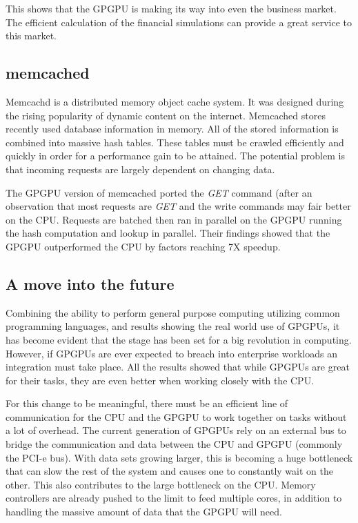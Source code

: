 This shows that the GPGPU is making its way into even the business market. The efficient calculation of the financial simulations can provide a great service to this market. \cite{finance}

\subsection*{memcached}


Memcachd is a distributed memory object cache system. It was designed during the rising popularity of dynamic content on the internet. Memcached stores recently used database information in memory. All of the stored information is combined into massive hash tables. These tables must be crawled efficiently and quickly in order for a performance gain to be attained. The potential problem is that incoming requests are largely dependent on changing data. 

The GPGPU version of memcached ported the \textit{GET} command (after an observation that most requests are \textit{GET} and the write commands may fair better on the CPU. Requests are batched then ran in parallel on the GPGPU running the hash computation and lookup in parallel. Their findings showed that the GPGPU outperformed the CPU by factors reaching 7X speedup. \cite{memcached}


\subsection*{A move into the future}

Combining the ability to perform general purpose computing utilizing common programming languages, and results showing the real world use of GPGPUs, it has become evident that the stage has been set for a big revolution in computing. However, if GPGPUs are ever expected to breach into enterprise workloads an integration must take place. All the results showed that while GPGPUs are great for their tasks, they are even better when working closely with the CPU. 

For this change to be meaningful, there must be an efficient line of communication for the CPU and the GPGPU to work together on tasks without a lot of overhead. The current generation of GPGPUs rely on an external bus to bridge the communication and data between the CPU and GPGPU (commonly the PCI-e bus). With data sets growing larger, this is becoming a huge bottleneck that can slow the rest of the system and causes one to constantly wait on the other. This also contributes to the large bottleneck on the CPU. Memory controllers are already pushed to the limit to feed multiple cores, in addition to handling the massive amount of data that the GPGPU will need.


